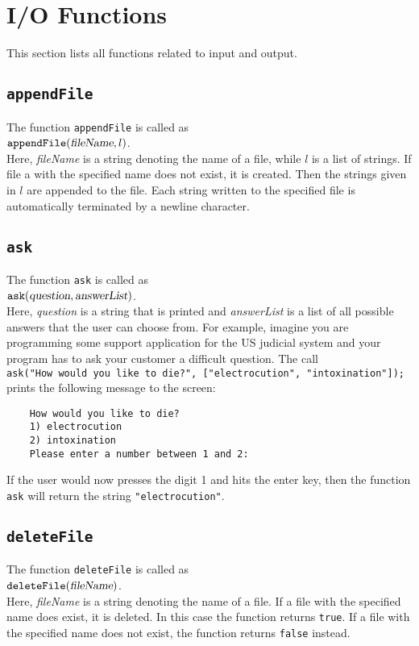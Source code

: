 \section{I/O Functions}
This  section lists all functions related to input and output.

\subsection{\texttt{appendFile}}
The function \texttt{appendFile} is called as
\\[0.2cm]
\hspace*{1.3cm}
$\mathtt{appendFile}(\textsl{fileName}, l)$.
\\[0.2cm]
Here, \textsl{fileName} is a string denoting the name of a file, while $l$ is a list of
strings.  If file a with the specified name does not exist, it is created.  Then the strings
given in $l$ are appended to the file.   Each string written to the specified file is
automatically  terminated by a newline character.

\subsection{\texttt{ask}}
The function \texttt{ask} is called as
\\[0.2cm]
\hspace*{1.3cm}
$\mathtt{ask(\textsl{question}, \textsl{answerList})}$.
\\[0.2cm]
Here, \textsl{question} is a string that is printed and \textsl{answerList} is a list of all
possible answers that the user can choose from.  For example, imagine you are programming some
support application for the US judicial system and your program has to ask your customer a difficult
question.  The call
\\[0.2cm]
\hspace*{1.3cm}
\texttt{ask("How would you like to die?", ["electrocution", "intoxination"]);}
\\[0.2cm]
prints the following message to the screen:
\begin{verbatim}
    How would you like to die?
    1) electrocution
    2) intoxination
    Please enter a number between 1 and 2: 
\end{verbatim} 
If the user would now presses the digit 1 and hits the enter key, then the function \texttt{ask} will
return the string \texttt{"electrocution"}.

\subsection{\texttt{deleteFile}}
The function \texttt{deleteFile} is called as
\\[0.2cm]
\hspace*{1.3cm}
$\mathtt{deleteFile}(\textsl{fileName})$.
\\[0.2cm]
Here, \textsl{fileName} is a string denoting the name of a file.
If a file with the specified name does exist, it is deleted.  In this case the function
returns \texttt{true}.  If a file with the specified name does not exist, the function
returns \texttt{false} instead.


